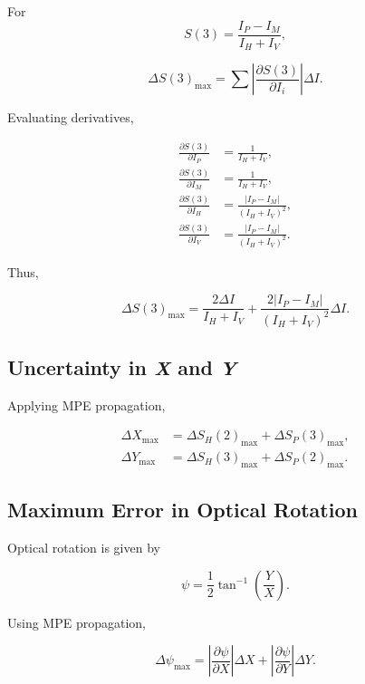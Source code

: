 For
\[
S(3)=\frac{I_P-I_M}{I_H+I_V},
\]

\begin{equation}
\Delta S(3)_{\max}
=
\sum
\left|
\frac{\partial S(3)}{\partial I_i}
\right|\Delta I .
\end{equation}

Evaluating derivatives,

\begin{subequations}
    \begin{align}
    \frac{\partial S(3)}{\partial I_P} &= \frac{1}{I_H+I_V},\\
    \frac{\partial S(3)}{\partial I_M} &= \frac{1}{I_H+I_V},\\
    \frac{\partial S(3)}{\partial I_H} &= 
    \frac{|I_P-I_M|}{(I_H+I_V)^2},\\
    \frac{\partial S(3)}{\partial I_V} &= 
    \frac{|I_P-I_M|}{(I_H+I_V)^2}.
    \end{align}
\end{subequations}

Thus,

\begin{equation}
\boxed{
\Delta S(3)_{\max}
=
\frac{2\Delta I}{I_H+I_V}
+
\frac{2|I_P-I_M|}{(I_H+I_V)^2}\Delta I.
}
\end{equation}

\subsection{Uncertainty in \textit{X} and \textit{Y}}

Applying MPE propagation,

\begin{align}
\Delta X_{\max} &= \Delta S_H(2)_{\max}
+ \Delta S_P(3)_{\max},\\
\Delta Y_{\max} &= \Delta S_H(3)_{\max}
+ \Delta S_P(2)_{\max}.
\end{align}

\subsection{Maximum Error in Optical Rotation}

Optical rotation is given by

\begin{equation}
\psi=\frac{1}{2}\tan^{-1}\left(\frac{Y}{X}\right).
\end{equation}

Using MPE propagation,

\begin{equation}
\Delta\psi_{\max}
=
\left|\frac{\partial \psi}{\partial X}\right|\Delta X
+
\left|\frac{\partial \psi}{\partial Y}\right|\Delta Y.
\end{equation}

